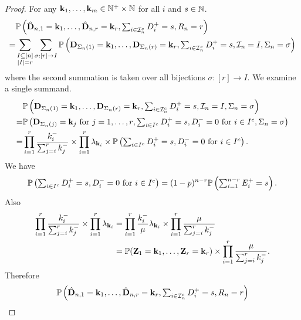\begin{proof}
    For any $\vk_1, \ldots, \vk_m \in \N^+ \times \N$ for all $i$ and $s \in \N$.
    \begin{align*}
        & \P\left(\hat{\vD}_{n, 1} = \vk_1, \ldots, \hat{\vD}_{n, r} = \vk_r, \textstyle \sum_{i \in \cI_n^c} D_i^+ = s, R_n = r \right) \\
        =& \sum_{\substack{I \subset [n] \\ \abs{I} = r}} \sum_{\sigma: [r] \to I}
        \P\left(\vD_{\Sigma_n(1)} = \vk_1, \ldots, \vD_{\Sigma_n(r)} = \vk_r, \textstyle \sum_{i \in \cI_n^c} D_i^+ = s, \cI_n = I, \Sigma_n = \sigma \right)
    \end{align*}
    where the second summation is taken over all bijections $\sigma: [r] \to I$. We examine a single summand.
    \begin{align*}
        &\P\left(\vD_{\Sigma_n(1)} = \vk_1, \ldots, \vD_{\Sigma_n(r)} = \vk_r, \textstyle \sum_{i \in \cI_n^c} D_i^+ = s, \cI_n = I, \Sigma_n = \sigma \right) \\
        =&\P\left(
            \vD_{\Sigma_n(j)} = \vk_j\ \text{for $j = 1, \ldots, r$},
            \textstyle \sum_{i \in I^c} D_i^+ = s,
            D^-_i = 0\ \text{for $i \in I^c$},
            \Sigma_n = \sigma
            \right)  \\
        =& \prod_{i=1}^r \frac{k_i^-}{\sum_{j=i}^r k_j^-}
        \times \prod_{i=1}^r \lambda_{\vk_i}
        \times \P\left( 
            \textstyle \sum_{i \in I^c} D_i^+ = s,
            D^-_i = 0\ \text{for $i \in I^c$}
         \right).
    \end{align*}
    We have
    \begin{equation*}
        \P\left( 
            \textstyle \sum_{i \in I^c} D_i^+ = s,
            D^-_i = 0\ \text{for $i \in I^c$}
         \right)
         = (1-p)^{n-r} \P\left( 
             \textstyle \sum_{i=1}^{n-r} E^+_i = s
          \right).
    \end{equation*}
    Also
    \begin{align*}
        \prod_{i=1}^r \frac{k_i^-}{\sum_{j=i}^r k_j^-} \times \prod_{i=1}^r \lambda_{\vk_i}
        &= \prod_{i=1}^r \frac{k_i^-}{\mu} \lambda_{\vk_i} \times \prod_{i=1}^r \frac{\mu}{\sum_{j=i}^r k_j^-} \\
        &= \P(\vZ_1 = \vk_1, \ldots, \vZ_r = \vk_r)
        \times \prod_{i=1}^r \frac{\mu}{\sum_{j=i}^r k_j^-}.
    \end{align*}
    Therefore
    \begin{align*}
        & \P\left(\hat{\vD}_{n, 1} = \vk_1, \ldots, \hat{\vD}_{n, r} = \vk_r, \textstyle \sum_{i \in \cI_n^c} D_i^+ = s, R_n = r \right) \\

\end{align*}
\end{proof}
